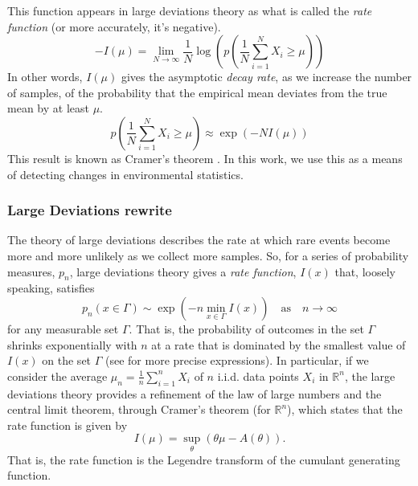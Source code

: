 \documentclass[10pt]{article}      %
\begin{document}
This function appears in large deviations theory \cite{dembo2009large,touchette_basic_2012} as what is called the \textit{rate function} (or more accurately, it's negative).
\begin{equation}
  -I(\mu) = \lim_{N \to \infty} \frac{1}{N} \log \left( p \left(\frac{1}{N} \sum_{i=1}^N X_i \ge \mu \right) \right)
\end{equation}
In other words, $I(\mu)$ gives the asymptotic \textit{decay rate}, as we increase the number of samples, of the probability that the empirical mean deviates from the true mean by at least $\mu$.
\begin{equation}
  p \left( \frac{1}{N} \sum_{i=1}^N X_i \ge \mu \right) \approx \exp(-N I(\mu))
\end{equation}
This result is known as Cramer's theorem \cite{dembo2009large}.
In this work, we use this as a means of detecting changes in environmental statistics. 


\subsubsection{Large Deviations rewrite}

The theory of large deviations \cite{dembo2009large,touchette_basic_2012} describes the rate at which rare events become more and more unlikely as we collect more samples. 
So, for a series of probability measures, $p_n$, large deviations theory gives a \textit{rate function}, $I(x)$ that, loosely speaking, satisfies
\begin{equation}
  p_n(x \in \Gamma) \sim \exp \left( - n \min_{x \in \Gamma} I(x) \right) \quad \textrm{as} \quad n \to \infty
\end{equation}
for any measurable set $\Gamma$.
That is, the probability of outcomes in the set $\Gamma$ shrinks exponentially with $n$ at a rate that is dominated by the smallest value of $I(x)$ on the set $\Gamma$ (see \cite{dembo2009large} for more precise expressions).
In particular, if we consider the average $\mu_n = \frac{1}{n} \sum_{i=1}^n X_i$ of $n$ i.i.d. data points $X_i$ in $\mathbb{R}^n$, the large deviations theory provides a refinement of the law of large numbers and the central limit theorem, through Cramer's theorem \cite{dembo2009large} (for $\mathbb{R}^n$), which states that the rate function is given by
\begin{equation}
  I(\mu) = \sup_{\theta}( \theta \mu - A(\theta) ). \label{eq:legendre_transform}
\end{equation}
That is, the rate function is the Legendre transform of the cumulant generating function.
\end{document}

